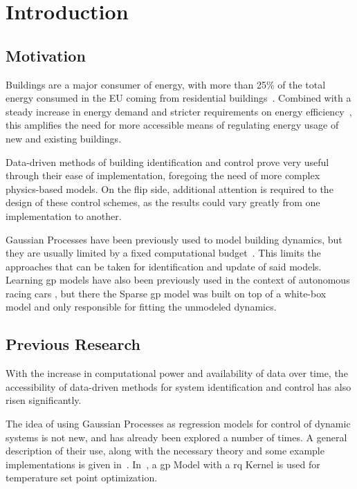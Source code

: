 \section{Introduction}

\subsection{Motivation}

Buildings are a major consumer of energy, with more than 25\% of the total
energy consumed in the EU coming from residential
buildings~\cite{tsemekiditzeiranakiAnalysisEUResidential2019}. Combined with a
steady increase in energy demand and stricter requirements on energy
efficiency~\cite{europeancommission.jointresearchcentre.EnergyConsumptionEnergy2018},
this amplifies the need for more accessible means of regulating energy usage of
new and existing buildings.

Data-driven methods of building identification and control prove very useful
through their ease of implementation, foregoing the need of more complex
physics-based models. On the flip side, additional attention is required to the
design of these control schemes, as the results could vary greatly from one
implementation to another.

Gaussian Processes have been previously used to model building dynamics, but
they are usually limited by a fixed computational
budget~\cite{jainLearningControlUsing2018,nghiemDatadrivenDemandResponse2017}.
This limits the approaches that can be taken for identification and update of
said models.  Learning \acrfull{gp} models have also been previously used in
the context of autonomous racing cars
\cite{kabzanLearningBasedModelPredictive2019}, but there the Sparse
\acrshort{gp} model was built on top of a white-box model and only responsible
for fitting the unmodeled dynamics.

\subsection{Previous Research}
With the increase in computational power and availability of data  over time,
the accessibility of data-driven methods for system identification and control
has also risen significantly. 

The idea of using Gaussian Processes as regression models for control of dynamic
systems is not new, and has already been explored a number of times. A general
description of their use, along with the necessary theory and some example
implementations is given in~\cite{kocijanModellingControlDynamic2016}.
In~\cite{pleweSupervisoryModelPredictive2020}, a \acrlong{gp} Model with a
\acrlong{rq} Kernel is used for temperature set point optimization.

